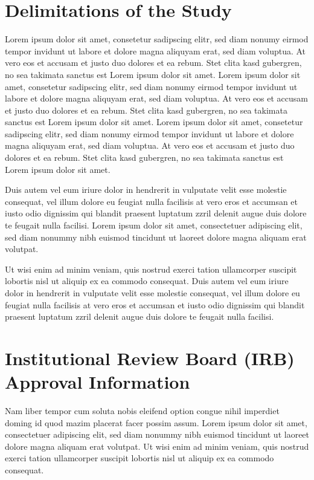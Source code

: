 \section{Delimitations of the Study}
Lorem ipsum dolor sit amet, consetetur sadipscing elitr,  sed diam nonumy eirmod
tempor invidunt ut labore et dolore magna aliquyam erat, sed diam voluptua. At
vero eos et accusam et justo duo dolores et ea rebum. Stet clita kasd gubergren,
no sea takimata sanctus est Lorem ipsum dolor sit amet. Lorem ipsum dolor sit
amet, consetetur sadipscing elitr,  sed diam nonumy eirmod tempor invidunt ut
labore et dolore magna aliquyam erat, sed diam voluptua. At vero eos et accusam
et justo duo dolores et ea rebum. Stet clita kasd gubergren, no sea takimata
sanctus est Lorem ipsum dolor sit amet. Lorem ipsum dolor sit amet, consetetur
sadipscing elitr,  sed diam nonumy eirmod tempor invidunt ut labore et dolore
magna aliquyam erat, sed diam voluptua. At vero eos et accusam et justo duo
dolores et ea rebum. Stet clita kasd gubergren, no sea takimata sanctus est
Lorem ipsum dolor sit amet.

Duis autem vel eum iriure dolor in hendrerit in vulputate velit esse molestie
consequat, vel illum dolore eu feugiat nulla facilisis at vero eros et accumsan
et iusto odio dignissim qui blandit praesent luptatum zzril delenit augue duis
dolore te feugait nulla facilisi. Lorem ipsum dolor sit amet, consectetuer
adipiscing elit, sed diam nonummy nibh euismod tincidunt ut laoreet dolore
magna aliquam erat volutpat.

Ut wisi enim ad minim veniam, quis nostrud exerci tation ullamcorper suscipit
lobortis nisl ut aliquip ex ea commodo consequat. Duis autem vel eum iriure
dolor in hendrerit in vulputate velit esse molestie consequat, vel illum dolore
eu feugiat nulla facilisis at vero eros et accumsan et iusto odio dignissim qui
blandit praesent luptatum zzril delenit augue duis dolore te feugait nulla
facilisi.

\section{Institutional Review Board (IRB) Approval Information}
Nam liber tempor cum soluta nobis eleifend option congue nihil imperdiet doming
id quod mazim placerat facer possim assum. Lorem ipsum dolor sit amet,
consectetuer adipiscing elit, sed diam nonummy nibh euismod tincidunt ut laoreet
dolore magna aliquam erat volutpat. Ut wisi enim ad minim veniam, quis nostrud
exerci tation ullamcorper suscipit lobortis nisl ut aliquip ex ea commodo
consequat.

